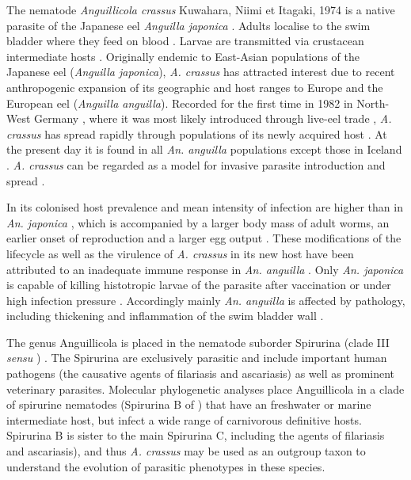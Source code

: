 \documentclass[10pt]{bmc_article}
\newenvironment{bmcformat}{\begin{raggedright}\baselineskip20pt\sloppy\setboolean{publ}{false}}{\end{raggedright}\baselineskip20pt\sloppy}
\begin{document}
\begin{bmcformat}
The nematode \textit{Anguillicola crassus} Kuwahara, Niimi et Itagaki,
1974 is a native parasite of the Japanese eel \textit{Anguilla
  japonica} \cite{kuwahara_Niimi_Itagaki_1974}. Adults localise to the
swim bladder where they feed on blood
\cite{polzer_identification_1993}. Larvae are transmitted via
crustacean intermediate hosts
\cite{de_charleroy_life_1990}. Originally endemic to East-Asian
populations of the Japanese eel (\textit{Anguilla japonica}),
\textit{A. crassus} has attracted interest due to recent anthropogenic
expansion of its geographic and host ranges to Europe and the European
eel (\textit{Anguilla anguilla}). Recorded for the first time in 1982
in North-West Germany \cite{fischer_teichwirt}, where it was most
likely introduced through live-eel trade
\cite{koops_anguillicola-infestations_1989, koie_swimbladder_1991},
\textit{A. crassus} has spread rapidly through populations of its
newly acquired host \cite{kirk_impact_2003}. At the present day it is
found in all \textit{An. anguilla} populations except those in Iceland
\cite{kristmundsson_parasite_2007}. \textit{A. crassus} can be
regarded as a model for invasive parasite introduction and spread
\cite{taraschewski_hosts_2007}.

In its colonised host prevalence and mean intensity of infection are
higher than in \textit{An. japonica} \cite{mnderle_occurrence_2006,
  lefebvre_anguillicolosis:_2004}, which is accompanied by a larger
body mass of adult worms, an earlier onset of reproduction and a
larger egg output \cite{knopf_differences_2004}. These modifications
of the lifecycle as well as the virulence of \textit{A. crassus} in
its new host have been attributed to an inadequate immune response in
\textit{An. anguilla} \cite{knopf_swimbladder_2006}. Only
\textit{An. japonica} is capable of killing histotropic larvae of the
parasite after vaccination \cite{knopf_vaccination_2008} or under high
infection pressure \cite{heitlinger_massive_2009}. Accordingly mainly
\textit{An. anguilla} is affected by pathology, including thickening
and inflammation of the swim bladder wall \cite{wurtz_tara_2000}.

The genus Anguillicola is placed in the nematode suborder Spirurina
(clade III \textit{sensu} \cite{blaxter_molecular_1998})
\cite{nadler_molecular_2007, wijov_evolutionary_2006}. The Spirurina
are exclusively parasitic and include important human pathogens (the
causative agents of filariasis and ascariasis) as well as prominent
veterinary parasites. Molecular phylogenetic analyses place
Anguillicola in a clade of spirurine nematodes (Spirurina B of
\cite{dl_py}) that have an freshwater or marine intermediate host, but
infect a wide range of carnivorous definitive hosts. Spirurina B is
sister to the main Spirurina C, including the agents of filariasis and
ascariasis), and thus \textit{A. crassus} may be used as an outgroup
taxon to understand the evolution of parasitic phenotypes in these
species.


\end{bmcformat}
\end{document}
